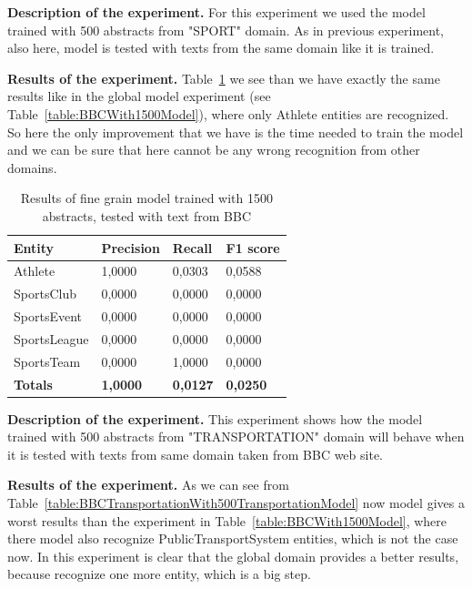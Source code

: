 \documentclass[thesis=M,english]{FITthesis}[2018/05/30]
\begin{document}
\textbf{Description of the experiment.} For this experiment we used the model trained with 500 abstracts from "SPORT" domain. As in previous experiment, also here, model is tested with texts from the same domain like it is trained.

\textbf{Results of the experiment.} Table~\ref{table:BBCSportWith500SportModel} we see than we have exactly the same results like in the global model experiment (see Table~\ref{table:BBCWith1500Model}), where only Athlete entities are recognized. So here the only improvement that we have is the time needed to train the model and we can be sure that here cannot be any wrong recognition from other domains.
	
	\begin{table}[H]\centering
	\begin{tabular}{|l|l|l|l|}
		\hline {\textbf{Entity}} & {\textbf{Precision}} & {\textbf{Recall}} & {\textbf{F1 score}}\\\hline
        Athlete & 1,0000 & 0,0303 & 0,0588\\
		SportsClub & 0,0000 & 0,0000 & 0,0000\\
    	SportsEvent & 0,0000 & 0,0000 & 0,0000\\
   		SportsLeague & 0,0000 & 0,0000 & 0,0000\\
   		SportsTeam & 0,0000 & 1,0000 & 0,0000\\\hline  
		\textbf{Totals} & \textbf{1,0000} & \textbf{0,0127} & \textbf{0,0250}\\\hline
	\end{tabular}			
		\caption{Results of fine grain model trained with 1500 abstracts, tested with text from BBC\label{table:BBCSportWith500SportModel}}
	\end{table}

\textbf{Description of the experiment.} This experiment shows how the model trained with 500 abstracts from "TRANSPORTATION" domain will behave when it is tested with texts from same domain taken from BBC web site.

\textbf{Results of the experiment.} As we can see from Table~\ref{table:BBCTransportationWith500TransportationModel} now model gives a worst results than the experiment in Table~\ref{table:BBCWith1500Model}, where there model also recognize PublicTransportSystem entities, which is not the case now. In this experiment is clear that the global domain provides a better results, because recognize one more entity, which is a big step. 
	
\end{document}
